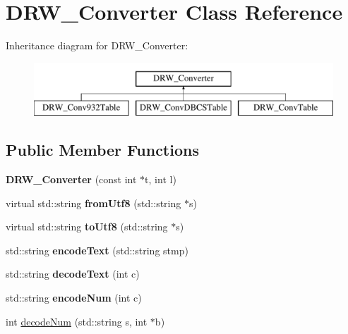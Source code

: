 \hypertarget{classDRW__Converter}{\section{D\-R\-W\-\_\-\-Converter Class Reference}
\label{classDRW__Converter}
}
Inheritance diagram for D\-R\-W\-\_\-\-Converter\-:\begin{figure}[H]
\begin{center}
\leavevmode
\includegraphics[height=2.000000cm]{classDRW__Converter}
\end{center}
\end{figure}
\subsection*{Public Member Functions}
\begin{DoxyCompactItemize}
\item 
\hypertarget{classDRW__Converter_a583536da23a6eeb9578ba47822e934d0}{{\bfseries D\-R\-W\-\_\-\-Converter} (const int $\ast$t, int l)}\label{classDRW__Converter_a583536da23a6eeb9578ba47822e934d0}

\item 
\hypertarget{classDRW__Converter_a6e31e109819b70e627d65db2d80c6b1e}{virtual std\-::string {\bfseries from\-Utf8} (std\-::string $\ast$s)}\label{classDRW__Converter_a6e31e109819b70e627d65db2d80c6b1e}

\item 
\hypertarget{classDRW__Converter_a13752f293af95a1f0e385338c8e2bbbd}{virtual std\-::string {\bfseries to\-Utf8} (std\-::string $\ast$s)}\label{classDRW__Converter_a13752f293af95a1f0e385338c8e2bbbd}

\item 
\hypertarget{classDRW__Converter_a84d914c23b228de7461c34719cf09d82}{std\-::string {\bfseries encode\-Text} (std\-::string stmp)}\label{classDRW__Converter_a84d914c23b228de7461c34719cf09d82}

\item 
\hypertarget{classDRW__Converter_a4251ca683bf021a7bf7b3202196f8bb3}{std\-::string {\bfseries decode\-Text} (int c)}\label{classDRW__Converter_a4251ca683bf021a7bf7b3202196f8bb3}

\item 
\hypertarget{classDRW__Converter_a405e675a12e030ade7eebc7bb9ab6ab5}{std\-::string {\bfseries encode\-Num} (int c)}\label{classDRW__Converter_a405e675a12e030ade7eebc7bb9ab6ab5}

\item 
int \hyperlink{classDRW__Converter_a728a48dadf1ad3c48d28f6c9c478284d}{decode\-Num} (std\-::string s, int $\ast$b)
\end{DoxyCompactItemize}
